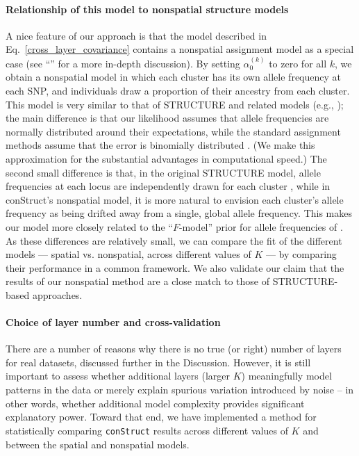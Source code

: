 \documentclass[10pt,letterpaper]{article}
\newcommand{\secref}[1]{``\nameref{#1}''}
\begin{document}
\paragraph{Relationship of this model to nonspatial structure models}

A nice feature of our approach is that the model described in Eq.\ \eqref{cross_layer_covariance} 
contains a nonspatial assignment model as a special case 
(see \secref{model_app} for a more in-depth discussion). 
By setting $\alpha_0^{(k)}$ to zero for all $k$, 
we obtain a nonspatial model in which each cluster has its own allele frequency at each SNP, 
and individuals draw a proportion of their ancestry from each cluster. 
This model is very similar to that of STRUCTURE \cite{STRUCTURE} 
and related models (e.g., \cite{ADMIXTURE}); 
the main difference is that our likelihood assumes that allele frequencies are normally distributed 
around their expectations, 
while the standard assignment methods assume that the error is binomially distributed \cite{Engelhardt2012}.  
(We make this approximation for the substantial advantages in
computational speed.)
The second small difference is that, in the original STRUCTURE model, 
allele frequencies at each locus are independently drawn for each 
cluster \cite{STRUCTURE}, while in conStruct's nonspatial model, 
it is more natural to envision each cluster's allele frequency 
as being drifted away from a single, global allele frequency. 
This makes our model more
closely related to the ``$F$-model'' prior for allele frequencies of \cite{falush2003}.
As these differences are relatively small, we can compare the fit of the different models 
--- spatial vs. nonspatial, across different values of $K$ --- 
by comparing their performance in a common framework. 
We also validate our claim that the results of our nonspatial method 
are a close match to those of STRUCTURE-based approaches.

\paragraph{Choice of layer number and cross-validation}
There are a number of reasons 
why there is no true (or right) number of layers for real datasets,
discussed further in the Discussion.
However, it is still important to assess whether additional layers (larger $K$)
meaningfully model patterns in the data
or merely explain spurious variation introduced by noise
-- in other words, whether additional model complexity
provides significant explanatory power.
Toward that end, we have implemented a method for 
statistically comparing \texttt{conStruct} results across different values of $K$ 
and between the spatial and nonspatial models.
\end{document}

